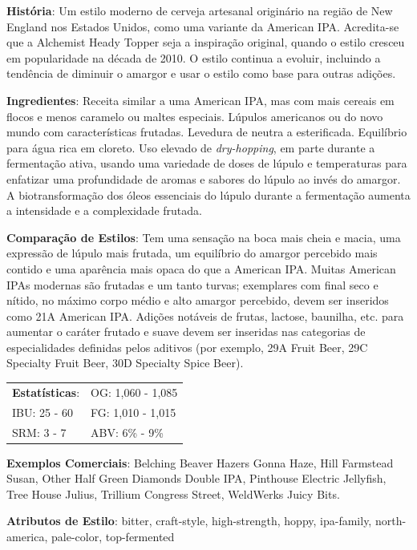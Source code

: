 \textbf{História}: Um estilo moderno de cerveja artesanal originário na região de New England nos Estados Unidos, como uma variante da American IPA. Acredita-se que a Alchemist Heady Topper seja a inspiração original, quando o estilo cresceu em popularidade na década de 2010. O estilo continua a evoluir, incluindo a tendência de diminuir o amargor e usar o estilo como base para outras adições.

\textbf{Ingredientes}: Receita similar a uma American IPA, mas com mais cereais em flocos e menos caramelo ou maltes especiais. Lúpulos americanos ou do novo mundo com características frutadas. Levedura de neutra a esterificada. Equilíbrio para água rica em cloreto. Uso elevado de \textit{dry-hopping}, em parte durante a fermentação ativa, usando uma variedade de doses de lúpulo e temperaturas para enfatizar uma profundidade de aromas e sabores do lúpulo ao invés do amargor. A biotransformação dos óleos essenciais do lúpulo durante a fermentação aumenta a intensidade e a complexidade frutada.

\textbf{Comparação de Estilos}: Tem uma sensação na boca mais cheia e macia, uma expressão de lúpulo mais frutada, um equilíbrio do amargor percebido mais contido e uma aparência mais opaca do que a American IPA. Muitas American IPAs modernas são frutadas e um tanto turvas; exemplares com final seco e nítido, no máximo corpo médio e alto amargor percebido, devem ser inseridos como 21A American IPA. Adições notáveis de frutas, lactose, baunilha, etc. para aumentar o caráter frutado e suave devem ser inseridas nas categorias de especialidades definidas pelos aditivos (por exemplo, 29A Fruit Beer, 29C Specialty Fruit Beer, 30D Specialty Spice Beer).

\begin{tabular}{@{}p{35mm}p{35mm}@{}}
  \textbf{Estatísticas}: & OG: 1,060 - 1,085 \\
  IBU: 25 - 60  & FG: 1,010 - 1,015 \\
  SRM: 3 - 7  & ABV: 6\% - 9\%
\end{tabular}

\textbf{Exemplos Comerciais}: Belching Beaver Hazers Gonna Haze, Hill Farmstead Susan, Other Half Green Diamonds Double IPA, Pinthouse Electric Jellyfish, Tree House Julius, Trillium Congress Street, WeldWerks Juicy Bits.

\textbf{Atributos de Estilo}: bitter, craft-style, high-strength, hoppy, ipa-family, north-america, pale-color, top-fermented
